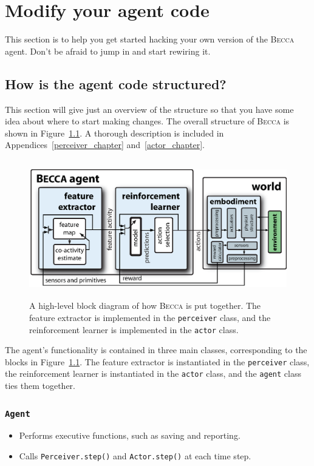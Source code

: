 \chapter{Modify your agent code}

This section is to help you get started hacking your own version of the \textsc{Becca} agent. Don't be afraid to jump in and start rewiring it.

\section{How is the agent code structured?}

This section will give just an overview of the structure so that you have some idea about where to start making changes. The overall structure of \textsc{Becca} is shown in Figure~\ref{becca_block}. A thorough description is included in Appendices~\ref{perceiver_chapter} and~\ref{actor_chapter}. 

\begin{figure}
\centering
\includegraphics[height=6cm]{figs/becca_0.4.5_block.eps}
\caption{A high-level block diagram of how \textsc{Becca} is put together. The feature extractor is implemented in the \texttt{perceiver} class, and the reinforcement learner is implemented in the \texttt{actor} class.}
\label{becca_block}
\end{figure}

The agent's functionality is contained in three main classes, corresponding to the blocks in Figure~\ref{becca_block}. The feature extractor is instantiated in the \texttt{perceiver} class, the reinforcement learner is instantiated in the \texttt{actor} class, and the \texttt{agent} class ties them together. 

\subsection{\texttt{Agent}}
\begin{itemize}
\item Performs executive functions, such as saving and reporting.
\item Calls \texttt{Perceiver.step()} and  \texttt{Actor.step()} at each time step.
\end{itemize}

